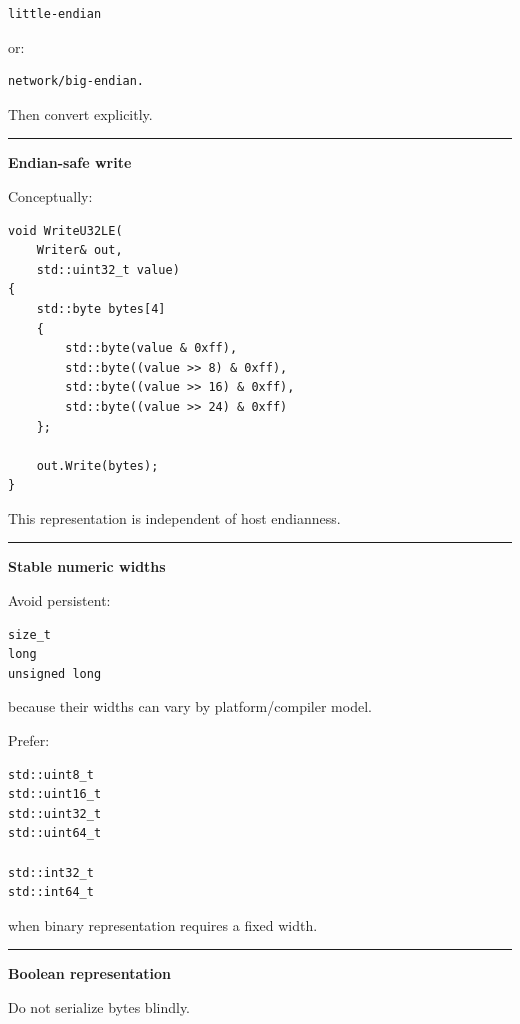 \begin{verbatim}
little-endian
\end{verbatim}

or:

\begin{verbatim}
network/big-endian.
\end{verbatim}

Then convert explicitly.

\begin{center}\rule{0.5\linewidth}{0.5pt}\end{center}

\textbf{Endian-safe write}

Conceptually:

\begin{verbatim}
void WriteU32LE(
    Writer& out,
    std::uint32_t value)
{
    std::byte bytes[4]
    {
        std::byte(value & 0xff),
        std::byte((value >> 8) & 0xff),
        std::byte((value >> 16) & 0xff),
        std::byte((value >> 24) & 0xff)
    };

    out.Write(bytes);
}
\end{verbatim}

This representation is independent of host endianness.

\begin{center}\rule{0.5\linewidth}{0.5pt}\end{center}

\textbf{Stable numeric widths}

Avoid persistent:

\begin{verbatim}
size_t
long
unsigned long
\end{verbatim}

because their widths can vary by platform/compiler model.

Prefer:

\begin{verbatim}
std::uint8_t
std::uint16_t
std::uint32_t
std::uint64_t

std::int32_t
std::int64_t
\end{verbatim}

when binary representation requires a fixed width.

\begin{center}\rule{0.5\linewidth}{0.5pt}\end{center}

\textbf{Boolean representation}

Do not serialize  bytes blindly.

